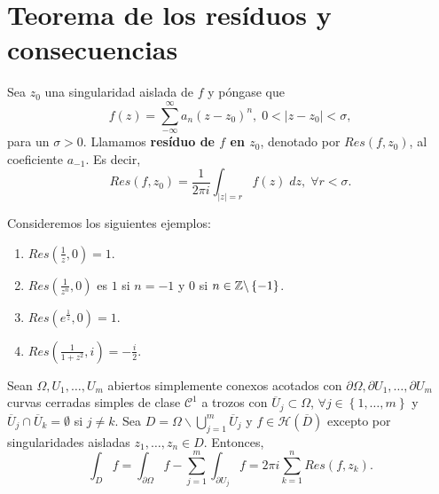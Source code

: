 \section{Teorema de los resíduos y consecuencias}
\begin{definition}
Sea $\displaystyle z_{0} $ una singularidad aislada de $\displaystyle f $ y póngase que 
\[f\left(z\right)=\sum^{\infty}_{-\infty}a_{n}\left(z-z_{0}\right)^{n}, \; 0 < \left|z-z_{0}\right|<\sigma  ,\]
para un $\displaystyle \sigma > 0 $. Llamamos \textbf{resíduo de $\displaystyle f $ en $\displaystyle z_{0} $}, denotado por $\displaystyle Res\left(f, z_{0}\right) $, al coeficiente $\displaystyle a_{-1} $. Es decir, 
\[Res\left(f, z_{0}\right)=\frac{1}{2\pi i}\int _{ \left|z\right|=r}f\left(z\right) \; dz, \; \forall r < \sigma  .\]
\end{definition}
\begin{eg}
Consideremos los siguientes ejemplos:
\begin{enumerate}
\item $\displaystyle Res\left(\frac{1}{z}, 0\right)=1 $. 
\item $\displaystyle Res\left(\frac{1}{z^{n}}, 0\right) $ es $\displaystyle 1 $ si $\displaystyle n = - 1 $ y $\displaystyle 0  $ si $\displaystyle n \in \mathbb{Z} \backslash \left\{ -1\right\}  $. 
\item $\displaystyle Res\left(e^{\frac{1}{z}}, 0\right)=1 $. 
\item $\displaystyle Res\left(\frac{1}{1+z^{2}}, i\right)= -\frac{i}{2}$.
\end{enumerate}
\end{eg}
\begin{theorem}
	Sean $\displaystyle \Omega, U_{1}, \ldots, U_{m} $ abiertos simplemente conexos acotados con $\displaystyle \partial \Omega, \partial U_{1}, \ldots, \partial U_{m} $ curvas cerradas simples de clase $\displaystyle \mathcal{C}^{1} $ a trozos con $\displaystyle \overline{U}_{j}\subset \Omega  $, $\displaystyle \forall j \in \left\{ 1, \ldots, m\right\}  $ y $\displaystyle \overline{U}_{j}\cap \overline{U}_{k}= \emptyset $ si $\displaystyle j \neq k $. 
	Sea $\displaystyle D = \Omega \backslash \bigcup_{j = 1}^{m}\overline{U}_{j} $ y $\displaystyle f \in \mathcal{H}\left(\overline{D}\right) $ excepto por singularidades aisladas $\displaystyle z_{1}, \ldots, z_{n}\in D $. 
	Entonces, 
	\[\int _{D} f = \int _{\partial \Omega }f -\sum^{m}_{j = 1}\int _{\partial U_{j}}f =2\pi i\sum^{n}_{k = 1}Res\left(f, z_{k}\right) .\]
\end{theorem}
